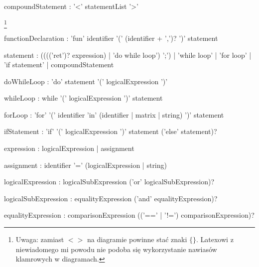 \documentclass[12pt,a4paper]{article}
\begin{document}
\begin{rail}
compoundStatement : '<' statementList '>'
\end{rail} \footnote{Uwaga: zamiast \textbf{$< >$} na diagramie powinne stać znaki \textbf{$\{ \}$}. Latexowi z niewiadomego mi powodu nie podoba się wykorzystanie nawiasów klamrowych w diagramach.}

\begin{rail}
functionDeclaration : 'fun' identifier '(' (identifier + ',')?  ')' statement
\end{rail}

\begin{rail}
statement : (((('ret')? expression) | 'do while loop') ';') | 'while loop' | 'for loop' | 'if statement' | compoundStatement
\end{rail}

\begin{rail}
doWhileLoop : 'do' statement '(' logicalExpression ')'
\end{rail}

\begin{rail}
whileLoop : while '(' logicalExpression ')' statement
\end{rail}

\begin{rail}
forLoop : 'for' '(' identifier 'in' (identifier | matrix | string) ')' statement
\end{rail}

\begin{rail}
ifStatement : 'if' '(' logicalExpression ')' statement ('else' statement)?
\end{rail}

\begin{rail}
expression : logicalExpression | assignment
\end{rail}

\begin{rail}
assignment : identifier '=' (logicalExpression | string) 
\end{rail}

\begin{rail}
logicalExpression : logicalSubExpression ('or'  logicalSubExpression)?
\end{rail}

\begin{rail}
logicalSubExpression : equalityExpression ('and'  equalityExpression)?
\end{rail}

\begin{rail}
equalityExpression : comparisonExpression (('==' | '!=') comparisonExpression)?
\end{rail}
\end{document}
